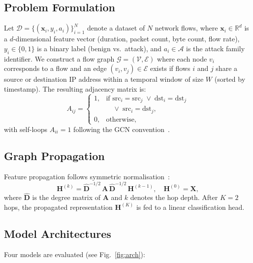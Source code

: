 \documentclass[conference]{IEEEtran}
\begin{document}
\subsection{Problem Formulation}\label{subsec:problem}
Let $\mathcal{D} = \{(\mathbf{x}_i, y_i, a_i)\}_{i=1}^{N}$ denote a dataset
of $N$ network flows, where $\mathbf{x}_i \in \mathbb{R}^{d}$ is a
$d$-dimensional feature vector (duration, packet count, byte count, flow rate),
$y_i \in \{0,1\}$ is a binary label (benign vs.\ attack), and
$a_i \in \mathcal{A}$ is the attack family identifier.  We construct a flow
graph $\mathcal{G} = (\mathcal{V}, \mathcal{E})$ where each node $v_i$
corresponds to a flow and an edge $(v_i, v_j) \in \mathcal{E}$ exists if flows
$i$ and $j$ share a source or destination IP address within a temporal window
of size $W$ (sorted by timestamp).  The resulting adjacency matrix is:
\begin{equation}\label{eq:adj}
  A_{ij} =
  \begin{cases}
    1, & \text{if } \mathrm{src}_i = \mathrm{src}_j \;\lor\; \mathrm{dst}_i = \mathrm{dst}_j \\
       & \quad \lor\; \mathrm{src}_i = \mathrm{dst}_j, \\
    0, & \text{otherwise},
  \end{cases}
\end{equation}
with self-loops $A_{ii} = 1$ following the GCN convention~\cite{kipf2017semi}.

\subsection{Graph Propagation}\label{subsec:propagation}
Feature propagation follows symmetric normalisation~\cite{kipf2017semi}:
\begin{equation}\label{eq:prop}
  \mathbf{H}^{(k)} = \hat{\mathbf{D}}^{-1/2}\,\mathbf{A}\,
                      \hat{\mathbf{D}}^{-1/2}\,\mathbf{H}^{(k-1)},
  \quad \mathbf{H}^{(0)} = \mathbf{X},
\end{equation}
where $\hat{\mathbf{D}}$ is the degree matrix of $\mathbf{A}$ and $k$ denotes
the hop depth.  After $K{=}2$ hops, the propagated representation
$\mathbf{H}^{(K)}$ is fed to a linear classification head.

\subsection{Model Architectures}\label{subsec:models}
Four models are evaluated (see Fig.~\ref{fig:arch}):
\end{document}

